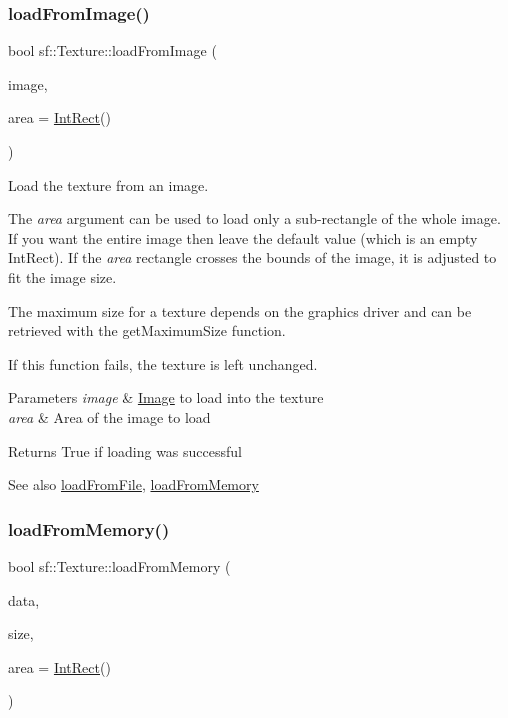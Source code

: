\subsubsection{\texorpdfstring{load\+From\+Image()}{loadFromImage()}}
{\footnotesize\ttfamily bool sf\+::\+Texture\+::load\+From\+Image (\begin{DoxyParamCaption}\item[{const \hyperlink{classsf_1_1_image}{Image} \&}]{image,  }\item[{const \hyperlink{classsf_1_1_rect}{Int\+Rect} \&}]{area = {\ttfamily \hyperlink{classsf_1_1_rect}{Int\+Rect}()} }\end{DoxyParamCaption})}



Load the texture from an image. 

The {\itshape area} argument can be used to load only a sub-\/rectangle of the whole image. If you want the entire image then leave the default value (which is an empty Int\+Rect). If the {\itshape area} rectangle crosses the bounds of the image, it is adjusted to fit the image size.

The maximum size for a texture depends on the graphics driver and can be retrieved with the get\+Maximum\+Size function.

If this function fails, the texture is left unchanged.


\begin{DoxyParams}{Parameters}
{\em image} & \hyperlink{classsf_1_1_image}{Image} to load into the texture \\
\hline
{\em area} & Area of the image to load\\
\hline
\end{DoxyParams}
\begin{DoxyReturn}{Returns}
True if loading was successful
\end{DoxyReturn}
\begin{DoxySeeAlso}{See also}
\hyperlink{classsf_1_1_texture_a8e1b56eabfe33e2e0e1cb03712c7fcc7}{load\+From\+File}, \hyperlink{classsf_1_1_texture_a2c4adb19dd4cbee0a588eeb85e52a249}{load\+From\+Memory} 
\end{DoxySeeAlso}
\mbox{\label{classsf_1_1_texture_a2c4adb19dd4cbee0a588eeb85e52a249}} 
\subsubsection{\texorpdfstring{load\+From\+Memory()}{loadFromMemory()}}
{\footnotesize\ttfamily bool sf\+::\+Texture\+::load\+From\+Memory (\begin{DoxyParamCaption}\item[{const void $\ast$}]{data,  }\item[{std\+::size\+\_\+t}]{size,  }\item[{const \hyperlink{classsf_1_1_rect}{Int\+Rect} \&}]{area = {\ttfamily \hyperlink{classsf_1_1_rect}{Int\+Rect}()} }\end{DoxyParamCaption})}




